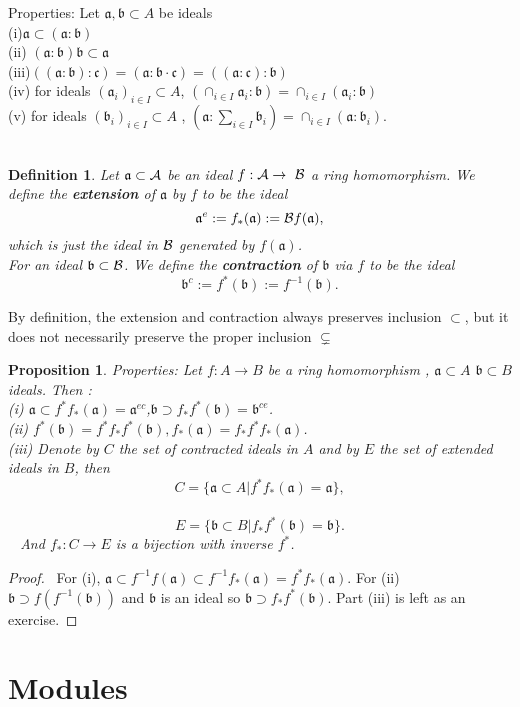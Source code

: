 \documentclass[11pt]{article}
\newtheorem{prop}[thm]{Proposition}
\newtheorem{dfn}[thm]{Definition}
\newcommand{\sca}{{\mathfrak a}}
\newcommand{\scb}{{\mathfrak b}}
\newcommand{\scc}{{\mathfrak c}}
\newcommand{\cala}{{\cal A}}
\newcommand{\calb}{{\cal B}}
\begin{document}
Properties: Let $\sca, \scb\subset A$ be ideals \\
(i)$\sca\subset (\sca:\scb)$\\
(ii) $(\sca:\scb)\scb\subset \sca$\\
(iii)$((\sca:\scb):\scc)=(\sca:\scb\cdot\scc)=((\sca:\scc):\scb)$\\
(iv) for ideals $(\sca_i)_{i\in I}\subset A$, $(\cap_{i\in I}\sca_i:\scb)=\cap_{i\in I}(\sca_i:\scb)$\\
(v) for ideals $(\scb_i)_{i\in I}\subset A$ , $(\sca:\sum_{i\in I }\scb_i)=\cap_{i\in I} (\sca:\scb_i)$.\\
 
\begin{dfn}\label{def:extention_contraction}
Let $\sca\subset \cala$ be an ideal $f: \cala\rightarrow  \calb$ a ring homomorphism. We define the \textbf{extension} of $\sca$ by $f$ to be the ideal 
$$
\sca^e:=f_{*}(\sca):=\calb f(\sca),
$$
which is just the ideal in $\calb$ generated by $f(\sca)$.\\
For an ideal $\scb\subset \calb$. We define the \textbf{contraction} of $\scb$ via $f$ to be the ideal 
$$
\scb^c:=f^*(\scb):=f^{-1}(\scb).
$$
\end{dfn}
{\color{red} By definition, the extension and contraction always preserves inclusion $\subset$, but it does not necessarily preserve the proper inclusion $\subsetneq$}
\begin{prop}\label{prop:properties_extension_contractino}
Properties: Let $f: A\rightarrow B$ be a ring homomorphism , $\sca\subset A$ $\scb\subset B$ ideals. Then :\\
(i) $\sca\subset f^*f_*(\sca)=\sca^{e c}$,$\scb\supset f_{*}f^*(\scb)=\scb^{ce}$.\\
(ii) $f^*(\scb)=f^* f_*f^*(\scb), f_*(\sca)=f_* f^*f_*(\sca)$.\\
(iii) Denote by $C$ the set of contracted ideals in $A$ and by $E$ the set of extended ideals in $B$, then 
$$
C=\{\sca\subset A|f^*f_*(\sca)=\sca\},
$$
 
$$
E=\{\scb\subset B| f_* f^*(\scb)=\scb\}.
$$ 
And $f_*: C\rightarrow E$ is a bijection with inverse $f^*$.
\end{prop}
\begin{proof}
 For (i), $\sca\subset f^{-1}f(\sca)\subset f^{-1}f_{*}(\sca)=f^{*}f_*(\sca)$. For (ii) $\scb \supset f(f^{-1}(\scb))$ and $\scb$ is an ideal so $\scb \supset f_{*}f^*(\scb)$. Part (iii) is left as an exercise.
\end{proof}
\section{Modules}
\end{document}
